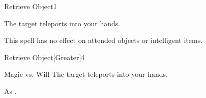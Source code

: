 \begin{spellsection}{Retrieve Object}{1}
    \begin{spellheader}
    \end{spellheader}
    \begin{spellcontent}
        \begin{spelltargetinginfo}
        \end{spelltargetinginfo}
        \begin{spelleffects}
            \spelleffect The target teleports into your hands.
        \end{spelleffects}
    \end{spellcontent}
    \begin{spellfooter}
        \spellnotes This spell has no effect on attended objects or intelligent items.
        \miscastrandom
    \end{spellfooter}
\end{spellsection}

\begin{spellsection}{Retrieve Object}[Greater]{4}
    \begin{spellheader}
    \end{spellheader}
    \begin{spellcontent}
        \begin{spelltargetinginfo}
        \end{spelltargetinginfo}
        \begin{spelleffects}
            \begin{spellattack}{Magic vs. Will}
                \spellsuccess The target teleports into your hands.
            \end{spellattack}
        \end{spelleffects}
    \end{spellcontent}
    \begin{spellfooter}
        \spellnotes As .
        \miscastrandom
    \end{spellfooter}
\end{spellsection}

